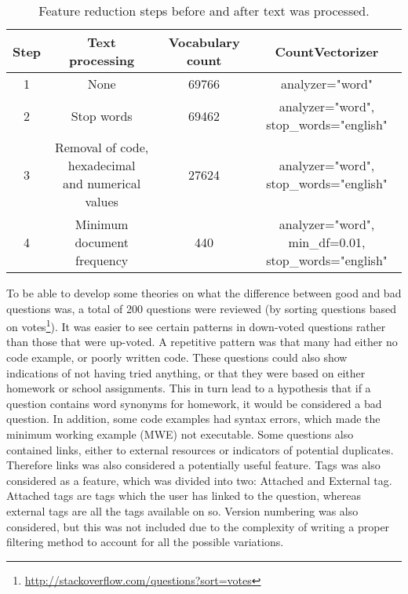 \begin{table}[h]%
	\centering
	\begin{tabular}{| c | c | c | c |}
		\hline
		Step & Text processing  & Vocabulary count & CountVectorizer  \\ \hline
		1 	& None 									& 69766 	& analyzer="word" \\ \hline
		2 	& Stop words 							& 69462 	& 
			\shortstack{analyzer="word", \\ stop\_words="english"} \\ \hline
		3 	& \shortstack{Removal of code, 
			hexadecimal \\ and numerical values} 	& 27624 	& 
			\shortstack{analyzer="word", \\ stop\_words="english"} \\ \hline
		4 	& Minimum document frequency 			& 440 		& 
				\shortstack{analyzer="word", min\_df=0.01, \\ stop\_words="english"} \\ \hline
	\end{tabular}
	\caption{Feature reduction steps before and after text was processed.}
	\label{tab:feature_reduction}
\end{table}
\noindent
To be able to develop some theories on what the difference between good and bad questions was, a total of 200 questions were reviewed (by sorting questions based on 
 votes\footnote{\url{http://stackoverflow.com/questions?sort=votes}}). 
It was easier to see certain patterns in down-voted questions rather than those that were up-voted. 
A repetitive pattern was that many had either no code example, or poorly written code. 
These questions could also show indications of not having tried anything, or that they were based on either homework or school assignments. 
This in turn lead to a hypothesis that if a question contains word synonyms for homework, it would be considered a bad question. 
In addition, some code examples had syntax errors, which made the minimum working example (MWE) not executable. 
Some questions also contained links, either to external resources or indicators of potential duplicates. 
Therefore links was also considered a potentially useful feature. 
Tags was also considered as a feature, which was divided into two: Attached and External tag. 
Attached tags are tags which the user has linked to the question, whereas external tags are all the tags available on \gls{so}.
Version numbering was also considered, but this was not included due to the complexity of writing a proper filtering method to account for all the possible variations.
